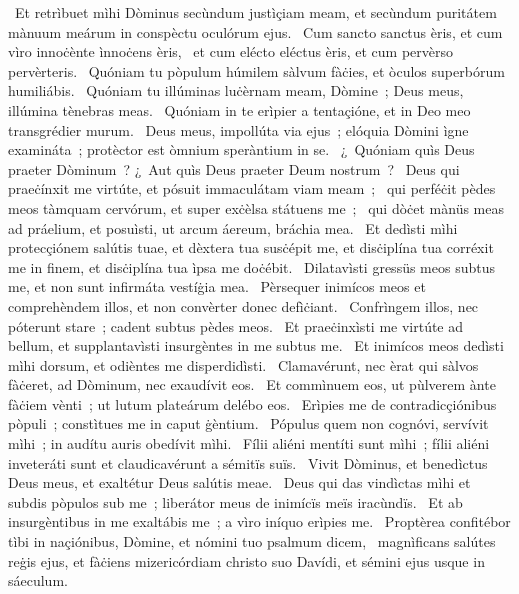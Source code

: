 {~Et retrìbuet mìhi Dòminus secùndum justìçiam meam, et secùndum puritátem mànuum meárum in conspèctu oculórum ejus. 
~Cum sancto sanctus èris, et cum vìro innoċènte ìnnoċens èris, 
~et cum elécto eléctus èris, et cum pervèrso pervèrteris. 
~Quóniam tu pòpulum húmilem sàlvum fàċies, et òculos superbórum humiliábis. 
~Quóniam tu illúminas luċèrnam meam, Dòmine~; Deus meus, illúmina tènebras meas. 
~Quóniam in te erìpier a tentaçióne, et in Deo meo transgrédier murum. 
~Deus meus, impollúta via ejus~; elóquia Dòmini ìgne examináta~; protèctor est òmnium speràntium in se. 
~¿~Quóniam quìs Deus praeter Dòminum~? ¿~Aut quìs Deus praeter Deum nostrum~? 
~Deus qui praeċínxit me virtúte, et pósuit immaculátam viam meam~; 
~qui perféċit pèdes meos tàmquam cervórum, et super exċèlsa státuens me~; 
~qui dòċet mànüs meas ad práelium, et posuìsti, ut arcum áereum, bráchia mea. 
~Et dedìsti mìhi protecçiónem salútis tuae, et dèxtera tua susċépit me, et disċiplína tua corréxit me in finem, et disċiplína tua ìpsa me doċébit. 
~Dilatavìsti gressüs meos subtus me, et non sunt infirmáta vestíġia mea. 
~Pèrsequer inimícos meos et comprehèndem illos, et non convèrter donec defìċiant. 
~Confrìngem illos, nec póterunt stare~; cadent subtus pèdes meos. 
~Et praeċinxìsti me virtúte ad bellum, et supplantavìsti insurgèntes in me subtus me. 
~Et inimícos meos dedìsti mìhi dorsum, et odièntes me disperdidìsti. 
~Clamavérunt, nec èrat qui sàlvos fàċeret, ad Dòminum, nec exaudívit eos. 
~Et commìnuem eos, ut pùlverem ànte fàċiem vènti~; ut lutum plateárum delébo eos. 
~Erìpies me de contradicçiónibus pòpuli~; constìtues me in caput ġèntium. 
~Pópulus quem non cognóvi, servívit mìhi~; in audítu auris obedívit mìhi. 
~Fílii aliéni mentíti sunt mìhi~; fílii aliéni inveteráti sunt et claudicavérunt a sémitïs suïs. 
~Vivit Dòminus, et benedìctus Deus meus, et exaltétur Deus salútis meae. 
~Deus qui das vindìctas mìhi et subdis pòpulos sub me~; liberátor meus de inimícïs meïs iracùndïs. 
~Et ab insurgèntibus in me exaltábis me~; a vìro iníquo erìpies me. 
~Proptèrea confitébor tìbi in naçiónibus, Dòmine, et nómini tuo psalmum dicem, 
~magnìficans salútes reġis ejus, et fàċiens mizericórdiam christo suo Davídi, et sémini ejus usque in sáeculum. 
}
